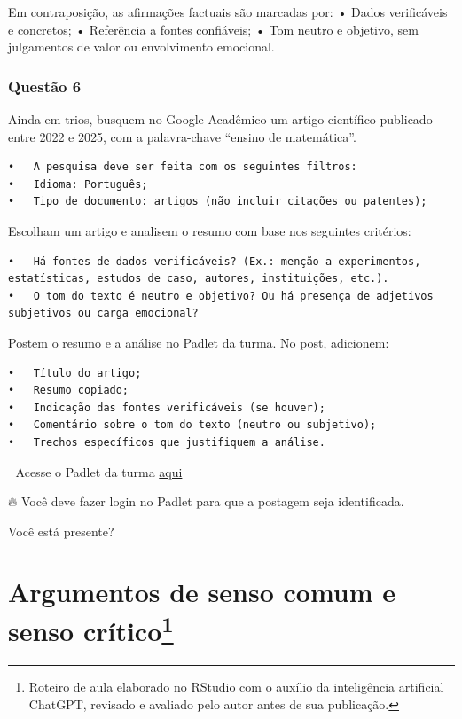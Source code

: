 \documentclass[
]{book}
\begin{document}
Em contraposição, as afirmações factuais são marcadas por:
• Dados verificáveis e concretos;
• Referência a fontes confiáveis;
• Tom neutro e objetivo, sem julgamentos de valor ou envolvimento emocional.

\subsection{Questão 6}\label{questuxe3o-6}

Ainda em trios, busquem no Google Acadêmico um artigo científico publicado entre 2022 e 2025, com a palavra-chave ``ensino de matemática''.

\begin{verbatim}
•   A pesquisa deve ser feita com os seguintes filtros:
•   Idioma: Português;
•   Tipo de documento: artigos (não incluir citações ou patentes);
\end{verbatim}

Escolham um artigo e analisem o resumo com base nos seguintes critérios:

\begin{verbatim}
•   Há fontes de dados verificáveis? (Ex.: menção a experimentos, estatísticas, estudos de caso, autores, instituições, etc.).
•   O tom do texto é neutro e objetivo? Ou há presença de adjetivos subjetivos ou carga emocional?
\end{verbatim}

Postem o resumo e a análise no Padlet da turma. No post, adicionem:

\begin{verbatim}
•   Título do artigo;
•   Resumo copiado;
•   Indicação das fontes verificáveis (se houver);
•   Comentário sobre o tom do texto (neutro ou subjetivo);
•   Trechos específicos que justifiquem a análise.
\end{verbatim}

🔗 Acesse o Padlet da turma \href{https://padlet.com/mariomartins/anete-t01-b3r3eohs4gd7np8m}{aqui}

🔥 Você deve fazer login no Padlet para que a postagem seja identificada.

Você está presente?

\chapter[Argumentos de senso comum e senso crítico]{\texorpdfstring{Argumentos de senso comum e senso crítico\footnote{Roteiro de aula elaborado no RStudio com o auxílio da inteligência artificial ChatGPT, revisado e avaliado pelo autor antes de sua publicação.}}{Argumentos de senso comum e senso crítico}}\label{argumentos-de-senso-comum-e-senso-cruxedtico1}
\end{document}
